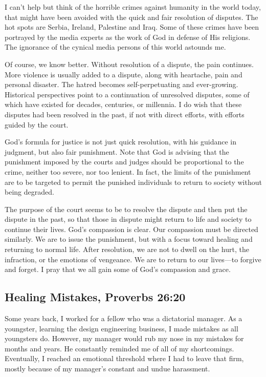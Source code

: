 \documentclass[12pt]{memoir}
\begin{document}
I can't help but think of the horrible crimes against humanity in
the world today, that might have been avoided with the quick and fair
resolution of disputes. The hot spots are Serbia, Ireland, Palestine
and Iraq. Some of these crimes have been portrayed by the media experts as the work of God in defense of His religions. The ignorance of the
cynical media persons of this world astounds me.

Of course, we know
better. Without resolution of a dispute, the pain continues. More
violence is usually added to a dispute, along with heartache, pain
and personal disaster. The hatred becomes self-perpetuating and ever-growing.
Historical perspectives point to a continuation of unresolved disputes,
some of which have existed for decades, centuries, or millennia. I
do wish that these disputes had been resolved in the past, if not
with direct efforts, with efforts guided by the court.

God's formula for justice is not just quick resolution, with his guidance
in judgment, but also fair punishment. Note that God is advising that
the punishment imposed by the courts and judges should be proportional
to the crime, neither too severe, nor too lenient. In fact, the limits of the punishment
are to be targeted to permit the punished individuals to return to
society without being degraded.

The purpose of the court seems to be to resolve the dispute and then put the dispute in the past, so that those in dispute might return to life and society to continue their lives. God's compassion is clear. Our compassion must be directed similarly. We are to issue the punishment, but with a focus toward
healing and returning to normal life. After resolution, we are not
to dwell on the hurt, the infraction, or the emotions of vengeance.
We are to return to our lives---to forgive and forget. I pray that
we all gain some of God's compassion and grace.

\subsection[Healing Mistakes]{Healing Mistakes, Proverbs 26:20}

Some years back, I worked for a fellow who was a dictatorial manager.
As a youngster, learning the design engineering business, I made mistakes
as all youngsters do. However, my manager would rub my nose in my mistakes for months and years. He constantly reminded me of
all of my shortcomings. Eventually, I reached an emotional threshold
where I had to leave that firm, mostly because of my manager's constant
and undue harassment.
\end{document}

